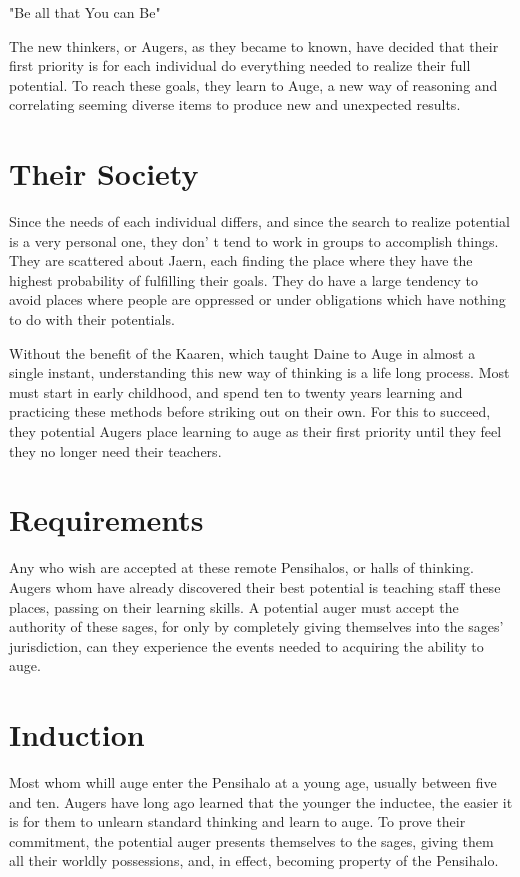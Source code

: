 "Be all that You can Be"

The new thinkers, or Augers, as they became to known, have decided that their first priority is for each individual do everything needed to realize their full potential. To reach these goals, they learn to Auge, a new way of reasoning and correlating seeming diverse items to produce new and unexpected results.

\section{Their Society}

Since the needs of each individual differs, and since the search to realize potential is a very personal one, they don' t tend to work in groups to accomplish things. They are scattered about Jaern, each finding the place where they have the highest probability of fulfilling their goals. They do have a large tendency to avoid places where people are oppressed or under obligations which have nothing to do with their potentials.

Without the benefit of the Kaaren, which taught Daine to Auge in almost a single instant, understanding this new way of thinking is a life long process. Most must start in early childhood, and spend ten to twenty years learning and practicing these methods before striking out on their own. For this to succeed, they potential Augers place learning to auge as their first priority until they feel they no longer need their teachers.

\section{Requirements}

Any who wish are accepted at these remote Pensihalos, or halls of thinking. Augers whom have already discovered their best potential is teaching staff these places, passing on their learning skills. A potential auger must accept the authority of these sages, for only by completely giving themselves into the sages'  jurisdiction, can they experience the events needed to acquiring the ability to auge.

\section{Induction}

Most whom whill auge enter the Pensihalo at a young age, usually between five and ten. Augers have long ago learned that the younger the inductee, the easier it is for them to unlearn standard thinking and learn to auge. To prove their commitment, the potential auger presents themselves to the sages, giving them all their worldly possessions, and, in effect, becoming property of the Pensihalo.

